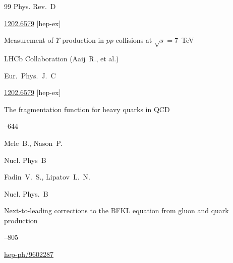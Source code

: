\begin{thebibliography}{99}
\jour Phys. Rev.~D 








\arxiv \href{http://arxiv.org/abs/1202.6579}{1202.6579} [hep-ex]

\paper Measurement of $\Upsilon$ production in $pp$ collisions at ${\sqrt s =7}$~TeV

\by  LHCb Collaboration (Aaij~R., et al.)

\jour Eur.~Phys.~J.~C 





\arxiv \href{http://arxiv.org/abs/1202.6579}{1202.6579} [hep-ex]




\paper The fragmentation function for heavy quarks in QCD




--644

\by Mele~B., Nason~P.


\jour Nucl. Phys~B 




\by Fadin~V.~S., Lipatov~L.~N.

\jour Nucl. Phys.~B 


\paper Next-to-leading corrections to the BFKL equation from gluon and quark production


--805



\arxiv \href{http://arxiv.org/abs/hep-ph/9602287}{hep-ph/9602287}



\end{thebibliography}






